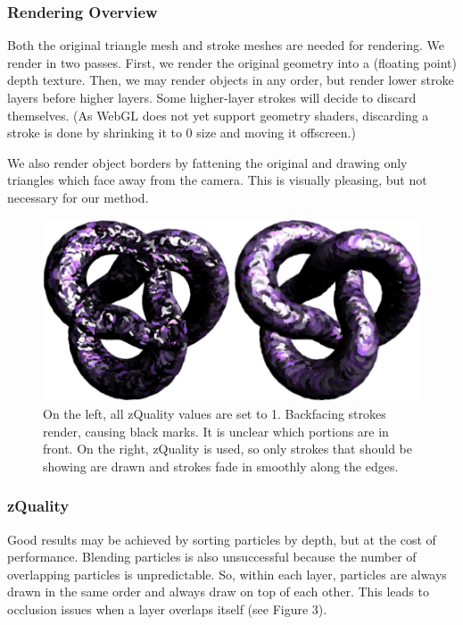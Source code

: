 \documentclass[conference]{acmsiggraph}
\begin{document}
\subsubsection{Rendering Overview}

Both the original triangle mesh and stroke meshes are needed for rendering. We
render in two passes. First, we render the original geometry into a (floating
point) depth texture. Then, we may render objects in any order, but render
lower stroke layers before higher layers. Some higher-layer strokes will decide
to discard themselves. (As WebGL does not yet support geometry shaders,
discarding a stroke is done by shrinking it to 0 size and moving it offscreen.)

We also render object borders by fattening the original and drawing only
triangles which face away from the camera. This is visually pleasing, but not
necessary for our method.

\begin{figure}[t] %
  \centering
  \includegraphics[width=4.5in]{images/torus_depth_test_demo}
  \caption{On the left, all zQuality values are set to 1. Backfacing strokes
           render, causing black marks. It is unclear which portions are in
           front. On the right, zQuality is used, so only strokes that should
           be showing are drawn and strokes fade in smoothly along the edges.}
\end{figure}

\subsubsection{zQuality}

Good results may be achieved by sorting particles by depth, but at the cost of
performance. Blending particles is also unsuccessful because the number of
overlapping particles is unpredictable. So, within each layer, particles are
always drawn in the same order and always draw on top of each other. This leads
to occlusion issues when a layer overlaps itself (see Figure 3).
\end{document}
